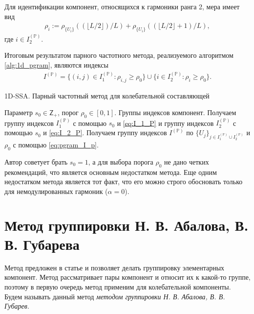 \documentclass[specialist,
               substylefile = spbu.rtx,
               subf,href,colorlinks=true, 12pt]{disser}
\begin{document}
Для идентификации компонент, относящихся к гармоники ранга 2, мера имеет вид
\begin{gather}\label{eq:rho_i}
\rho_{i} := \rho_{\{U_i\}}((\lfloor L/2 \rfloor)/L) + \rho_{\{U_i\}}((\lfloor L/2 \rfloor + 1)/L),
\end{gather}
где $i \in I_2^{(\mathbb{P})}$.

Итоговым результатом парного частотного метода, реализуемого алгоритмом \ref{alg:1d_pgram}, являются индексы 
\begin{gather} \label{eq:pgram_I_p}
I^{(\mathbb{P})} = \{ (i,j) \in I_1^{(\mathbb{P})}: \rho_{i,j} \geqslant\rho_0 \} \cup \{ i \in I_2^{(\mathbb{P})}: \rho_{i} \geqslant\rho_0 \}.
\end{gather}

\begin{algorithm}[!hhh]
\caption{1D-SSA. Парный частотный метод для колебательной составляющей}
\label{alg:1d_pgram}
\begin{algorithmic}[1]
\REQUIRE Параметр $s_0 \in \mathsf{Z}_{+}$, порог $\rho_0 \in [0,1]$.
\ENSURE Группы индексов компонент.
\STATE  Получаем группу индексов $I_1^{(\mathbb{P})}$ с помощью $s_0$ и \eqref{eq:I_1_P} и группу индексов $I_2^{(\mathbb{P})}$ с помощью $s_0$ и \eqref{eq:I_2_P}.
\STATE Получаем группу индексов $I^{(\mathbb{P})}$ по $\{U_j\}_{j \in I_1^{(\mathbb{P})} \cup I_2^{(\mathbb{P})}}$ и $\rho_0$ с помощью \eqref{eq:pgram_I_p}.
\end{algorithmic}
\end{algorithm}

Автор \cite{Alexandrov2006} советует брать $s_0 = 1$, а для выбора порога $\rho_0$ не дано четких рекомендаций, что является основным недостатком метода. Еще одним недостатком метода является тот факт, что его можно строго обосновать только для немодулированных гармоник ($\alpha = 0$).

\section{Метод группировки Н. В. Абалова, В. В. Губарева}
Метод предложен в статье \cite{Abalov2015} и позволяет делать группировку элементарных компонент. Метод рассматривает пары компонент и относит их к какой-то группе, поэтому в первую очередь метод применим для колебательной компоненты.    Будем называть данный метод \textit{методом группировки Н. В. Абалова, В. В. Губарев}.
\end{document}
